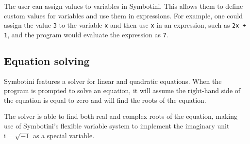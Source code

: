The user can assign values to variables in Symbotini. This allows them to define custom values for variables and use them in expressions. For example, one could assign the value \verb|3| to the variable \verb|x| and then use \verb|x| in an expression, such as \verb|2x + 1|, and the program would evaluate the expression as \verb|7|.

\subsection{Equation solving}\label{subsec:equation-solving}

Symbotini features a solver for linear and quadratic equations. When the program is prompted to solve an equation, it will assume the right-hand side of the equation is equal to zero and will find the roots of the equation.

The solver is able to find both real and complex roots of the equation, making use of Symbotini's flexible variable system to implement the imaginary unit $\mathrm{i} = \sqrt{-1}$ as a special variable.
